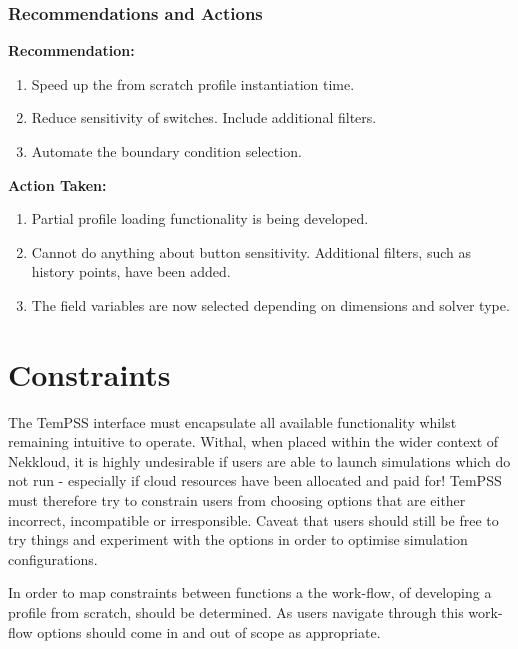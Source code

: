 \documentclass[11pt, a4paper]{report}
\begin{document}
\subsection{Recommendations and Actions}
\begin{multicols}{2}

\textbf{Recommendation:}
\begin{enumerate}
\item Speed up the from scratch profile instantiation time.
\item Reduce sensitivity of switches. Include additional filters.\\ 
\item Automate the boundary condition selection.\\
\end{enumerate}

\columnbreak

\textbf{Action Taken:}
\begin{enumerate}
\item Partial profile loading functionality is being developed.
\item Cannot do anything about button sensitivity. Additional filters, such as history points, have been added.
\item The field variables are now selected depending on dimensions and solver type.
\end{enumerate}

\end{multicols}

\chapter{Constraints}
\label{sec:constraints}
The TemPSS interface must encapsulate all available functionality whilst remaining intuitive to operate. Withal, when placed within the wider context of Nekkloud, it is highly undesirable if users are able to launch simulations which do not run - especially if cloud resources have been allocated and paid for! TemPSS must therefore try to constrain users from choosing options that are either incorrect, incompatible or irresponsible. Caveat that users should still be free to try things and experiment with the options in order to optimise simulation configurations.

In order to map constraints between functions a the work-flow, of developing a profile from scratch, should be determined. As users navigate through this work-flow options should come in and out of scope as appropriate.
\end{document}
